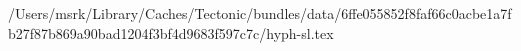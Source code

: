/Users/msrk/Library/Caches/Tectonic/bundles/data/6ffe055852f8faf66c0acbe1a7fb27f87b869a90bad1204f3bf4d9683f597c7c/hyph-sl.tex